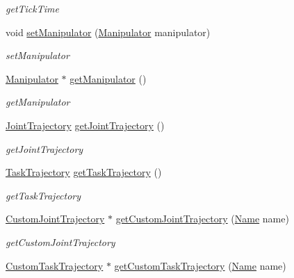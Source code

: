 \begin{DoxyCompactItemize}
\begin{DoxyCompactList}\small\item\em get\+Tick\+Time \end{DoxyCompactList}\item 
void \hyperlink{classrobotis__manipulator_1_1_trajectory_a19b2f886aff8fcb4bef369f2a8e0fac0}{set\+Manipulator} (\hyperlink{classrobotis__manipulator_1_1_manipulator}{Manipulator} manipulator)
\begin{DoxyCompactList}\small\item\em set\+Manipulator \end{DoxyCompactList}\item 
\hyperlink{classrobotis__manipulator_1_1_manipulator}{Manipulator} $\ast$ \hyperlink{classrobotis__manipulator_1_1_trajectory_ae5276de42edf154de107c1f194f6b322}{get\+Manipulator} ()
\begin{DoxyCompactList}\small\item\em get\+Manipulator \end{DoxyCompactList}\item 
\hyperlink{classrobotis__manipulator_1_1_joint_trajectory}{Joint\+Trajectory} \hyperlink{classrobotis__manipulator_1_1_trajectory_a378a65986082eb2bc125928b7e56889d}{get\+Joint\+Trajectory} ()
\begin{DoxyCompactList}\small\item\em get\+Joint\+Trajectory \end{DoxyCompactList}\item 
\hyperlink{classrobotis__manipulator_1_1_task_trajectory}{Task\+Trajectory} \hyperlink{classrobotis__manipulator_1_1_trajectory_a1e4ee32908b244fea91919f1013e2e6a}{get\+Task\+Trajectory} ()
\begin{DoxyCompactList}\small\item\em get\+Task\+Trajectory \end{DoxyCompactList}\item 
\hyperlink{classrobotis__manipulator_1_1_custom_joint_trajectory}{Custom\+Joint\+Trajectory} $\ast$ \hyperlink{classrobotis__manipulator_1_1_trajectory_ac45c691a9fee06027d17ea6e55d688ea}{get\+Custom\+Joint\+Trajectory} (\hyperlink{namespacerobotis__manipulator_a08c2d25e77a01ad75b9bb740f8ce4765}{Name} name)
\begin{DoxyCompactList}\small\item\em get\+Custom\+Joint\+Trajectory \end{DoxyCompactList}\item 
\hyperlink{classrobotis__manipulator_1_1_custom_task_trajectory}{Custom\+Task\+Trajectory} $\ast$ \hyperlink{classrobotis__manipulator_1_1_trajectory_afbfddec6e3015179c30b76d5142f54c3}{get\+Custom\+Task\+Trajectory} (\hyperlink{namespacerobotis__manipulator_a08c2d25e77a01ad75b9bb740f8ce4765}{Name} name)

\end{DoxyCompactItemize}
